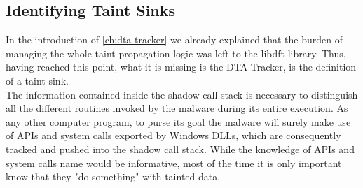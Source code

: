\documentclass[LaM,binding=0.6cm]{sapthesis}
\begin{document}
\subsection{Identifying Taint Sinks}
\label{subsec:taintsinks}
In the introduction of \autoref{ch:dta-tracker} we already explained that the burden of managing the whole taint propagation logic was left to the libdft library. Thus, having reached this point, what it is missing is the {\sf DTA-Tracker}, is the definition of a taint sink.\\

The information contained inside the shadow call stack is necessary to distinguish all the different routines invoked by the malware during its entire execution. As any other computer program, to purse its goal the malware will surely make use of APIs and system calls exported by Windows DLLs, which are consequently tracked and pushed into the shadow call stack. While the knowledge of APIs and system calls name would be informative, most of the time it is only important know that they "do something" with tainted data.
\end{document}
